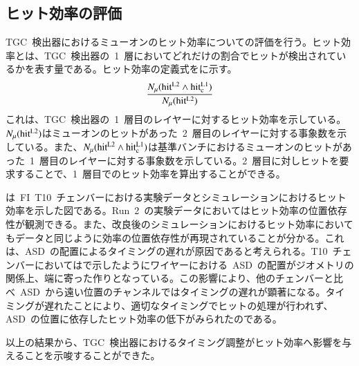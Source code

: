 \subsection{ヒット効率の評価}
TGC~検出器におけるミューオンのヒット効率についての評価を行う。ヒット効率とは、TGC~検出器の~1~層においてどれだけの割合でヒットが検出されているかを表す量である。ヒット効率の定義式をに示す。
\begin{align}
        \frac{N_{\mu}(\rm{hit^{L2}\land hit^{L1}_c)}}{N_{\mu}(\rm{hit^{L2}})}
    \label{eq:hit}
\end{align}
これは、TGC~検出器の~1~層目のレイヤーに対するヒット効率を示している。$N_{\mu}(\rm{hit^{L2}})$はミューオンのヒットがあった~2~層目のレイヤーに対する事象数を示している。また、$N_{\mu}(\rm{hit^{L2}\land hit^{L1}_c)}$は基準バンチにおけるミューオンのヒットがあった~1~層目のレイヤーに対する事象数を示している。2~層目に対しヒットを要求することで、1~層目でのヒット効率を算出することができる。

は~FI~T10~チェンバーにおける実験データとシミュレーションにおけるヒット効率を示した図である。Run~2~の実験データにおいてはヒット効率の位置依存性が観測できる。また、改良後のシミュレーションにおけるヒット効率においてもデータと同じように効率の位置依存性が再現されていることが分かる。これは、ASD~の配置によるタイミングの遅れが原因であると考えられる。T10~チェンバーにおいてはで示したようにワイヤーにおける~ASD~の配置がジオメトリの関係上、端に寄った作りとなっている。この影響により、他のチェンバーと比べ~ASD~から遠い位置のチャンネルではタイミングの遅れが顕著になる。タイミングが遅れたことにより、適切なタイミングでヒットの処理が行われず、ASD~の位置に依存したヒット効率の低下がみられたのである。

以上の結果から、TGC~検出器におけるタイミング調整がヒット効率へ影響を与えることを示唆することができた。

